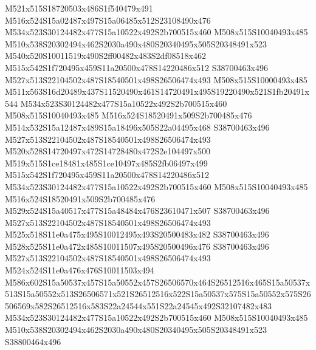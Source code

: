 \documentclass{article}
\begin{document}
\begin{multicols}{2}
M521x515S18720503x486S1f540479x491 M516x524S15a02487x497S15a06485x512S23108490x476 M534x523S30124482x477S15a10522x492S2b700515x460 M508x515S10040493x485 M510x538S20302494x462S2030a490x480S20340495x505S20348491x523 M540x520S10011519x490S2ff00482x483S2df08518x462 M515x542S1f720495x459S11a20500x478S14220486x512 S38700463x496 M527x513S22104502x487S18540501x498S26506474x493 M508x515S10000493x485 M511x563S16d20489x437S11520490x461S14720491x495S19220490x521S1fb20491x544 M534x523S30124482x477S15a10522x492S2b700515x460 M508x515S10040493x485 M516x524S18520491x509S2b700485x476 M514x532S15a12487x489S15a18496x505S22a04495x468 S38700463x496 M527x513S22104502x487S18540501x498S26506474x493 M520x528S14720497x472S14728480x472S2e104497x500 M519x515S1ce18481x485S1ce10497x485S2fb06497x499 M515x542S1f720495x459S11a20500x478S14220486x512 M534x523S30124482x477S15a10522x492S2b700515x460 M508x515S10040493x485 M516x524S18520491x509S2b700485x476 M529x524S15a40517x477S15a48484x476S23610471x507 S38700463x496 M527x513S22104502x487S18540501x498S26506474x493 M525x518S11e0a475x495S10012495x493S20500483x482 S38700463x496 M528x525S11e0a472x485S10011507x495S20500496x476 S38700463x496 M527x513S22104502x487S18540501x498S26506474x493 M524x524S11e0a476x476S10011503x494 M586x602S15a50537x457S15a50552x457S26506570x464S26512516x465S15a50537x513S15a50552x513S26506571x521S26512516x522S15a50537x575S15a50552x575S26506569x582S26512516x583S22a24544x551S22a24545x492S32107482x483 M534x523S30124482x477S15a10522x492S2b700515x460 M508x515S10040493x485 M510x538S20302494x462S2030a490x480S20340495x505S20348491x523 S38800464x496


\end{multicols}
\end{document}
